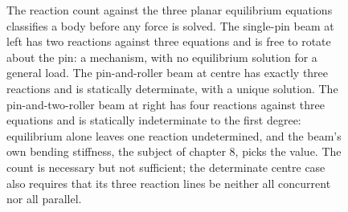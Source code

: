 \begin{figure}[htbp]
\caption[The determinacy classification on three beams]{The reaction
count against the three planar equilibrium equations classifies a body
before any force is solved. The single-pin beam at left has two reactions
against three equations and is free to rotate about the pin: a mechanism,
with no equilibrium solution for a general load. The pin-and-roller beam
at centre has exactly three reactions and is statically determinate, with
a unique solution. The pin-and-two-roller beam at right has four
reactions against three equations and is statically indeterminate to the
first degree: equilibrium alone leaves one reaction undetermined, and the
beam's own bending stiffness, the subject of chapter 8, picks the value.
The count is necessary but not sufficient; the determinate centre case
also requires that its three reaction lines be neither all concurrent nor
all parallel.}
\label{fig:vol03ch02:determinacy-cases}
\end{figure}
